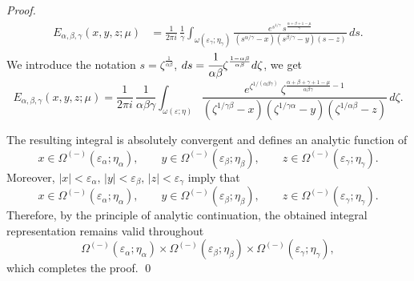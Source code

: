 \documentclass[12pt, reqno]{amsart}
\theoremstyle{definition}
\theoremstyle{remark}
\numberwithin{equation}{section}
\begin{document}
\begin{proof}
\begin{equation}\label{1.3}
\begin{aligned}
E_{\alpha,\beta,\gamma}(x,y,z;\mu)
&=
\frac{1}{2\pi i}\,
\frac{1}{\gamma}
\int_{\omega(\varepsilon_\gamma;\eta_\gamma)}
\frac{
e^{s^{1/\gamma}}
\,s^{\frac{\alpha+\beta+1-\mu}{\gamma}}
}
{
(s^{\alpha/\gamma}-x)(s^{\beta/\gamma}-y)(s-z)
}
\,ds.
\end{aligned}\end{equation}
We introduce the notation
$s=\zeta^{\frac{1}{\alpha\beta}}$, $ds=\cfrac{1}{\alpha\beta}\zeta^{\frac{1-\alpha\beta}{\alpha\beta}}d\zeta$, we get
\begin{equation}\label{1.4}
E_{\alpha,\beta,\gamma}(x,y,z;\mu)
=
\frac{1}{2\pi i}\,
\frac{1}{\alpha\beta\gamma}
\int_{\omega(\varepsilon;\eta)}
\frac{
e^{\zeta^{1/(\alpha\beta\gamma)}}
\,\zeta^{\frac{\alpha+\beta+\gamma+1-\mu}{\alpha\beta\gamma}-1}
}
{
(\zeta^{1/\gamma\beta}-x)(\zeta^{1/\gamma\alpha}-y)(\zeta^{1/\alpha\beta}-z)
}
\,d\zeta.\end{equation}

The resulting integral is absolutely convergent and defines an analytic function of
\[
x\in\Omega^{(-)}(\varepsilon_\alpha;\eta_\alpha),\qquad
y\in\Omega^{(-)}(\varepsilon_\beta;\eta_\beta),\qquad
z\in\Omega^{(-)}(\varepsilon_\gamma;\eta_\gamma).
\]
Moreover,
$
|x|<\varepsilon_\alpha,\,
|y|<\varepsilon_\beta,\,
|z|<\varepsilon_\gamma
$
imply that
\[
x\in\Omega^{(-)}(\varepsilon_\alpha;\eta_\alpha),\qquad
y\in\Omega^{(-)}(\varepsilon_\beta;\eta_\beta),\qquad
z\in\Omega^{(-)}(\varepsilon_\gamma;\eta_\gamma).
\]
Therefore, by the principle of analytic continuation, the obtained integral representation remains valid throughout
\[
\Omega^{(-)}(\varepsilon_\alpha;\eta_\alpha)
\times
\Omega^{(-)}(\varepsilon_\beta;\eta_\beta)
\times
\Omega^{(-)}(\varepsilon_\gamma;\eta_\gamma),
\]
which completes the proof. \qed
\end{proof}
\end{document}
